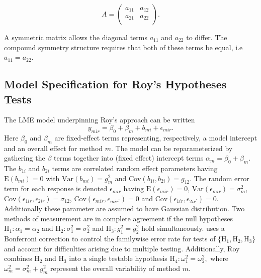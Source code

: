 \documentclass[12pt, a4paper]{report}
\theoremstyle{plain}
\theoremstyle{definition}
\theoremstyle{remark}
\begin{document}
	\[
	{A} = \left( \begin{array}{cc}
	a_{11} & a_{12}  \\
	a_{21} & a_{22}  \\
	\end{array}\right).
	\]
	
	A symmetric matrix allows the diagonal terms $a_{11}$ and $a_{22}$ to differ. The compound symmetry structure requires that both of these terms be equal, i.e $a_{11} = a_{22}$.
	
	\subsection{Model Specification for Roy's Hypotheses Tests}
	The LME model underpinning Roy's approach can be written
	\begin{equation}\label{ARoy2009-model}
	y_{mir} = \beta_{0} + \beta_{m} + b_{mi} + \epsilon_{mir}.
	\end{equation}
	Here $\beta_0$ and $\beta_m$ are fixed-effect terms representing, respectively, a model intercept and an overall effect for method $m.$ The model can be reparameterized by gathering the $\beta$ terms together into (fixed effect) intercept terms $\alpha_m=\beta_0+\beta_m.$ The $b_{1i}$ and $b_{2i}$ terms are correlated random effect parameters having $\mathrm{E}(b_{mi})=0$ with $\mathrm{Var}(b_{mi})=g^2_m$ and $\mathrm{Cov}(b_{1i}, b_{2 i})=g_{12}.$ The random error term for each response is denoted $\epsilon_{mir}$ having $\mathrm{E}(\epsilon_{mir})=0$, $\mathrm{Var}(\epsilon_{mir})=\sigma^2_m$, $\mathrm{Cov}(\epsilon_{1ir}, \epsilon_{2 ir})=\sigma_{12}$, $\mathrm{Cov}(\epsilon_{mir}, \epsilon_{mir^\prime})= 0$ and $\mathrm{Cov}(\epsilon_{1ir}, \epsilon_{2 ir^\prime})= 0.$ Additionally these parameter are assumed to have Gaussian distribution. Two methods of measurement are in complete agreement if the null hypotheses $\mathrm{H}_1\colon \alpha_1 = \alpha_2$ and $\mathrm{H}_2\colon \sigma^2_1 = \sigma^2_2 $ and $\mathrm{H}_3\colon g^2_1= g^2_2$ hold simultaneously. \citet{ARoy2009} uses a Bonferroni correction to control the familywise error rate for tests of $\{\mathrm{H}_1, \mathrm{H}_2, \mathrm{H}_3\}$ and account for difficulties arising due to multiple testing. Additionally, Roy combines $\mathrm{H}_2$ and $\mathrm{H}_3$ into a single testable hypothesis $\mathrm{H}_4\colon \omega^2_1=\omega^2_2,$ where $\omega^2_m = \sigma^2_m + g^2_m$ represent the overall variability of method $m.$
	
\end{document}
